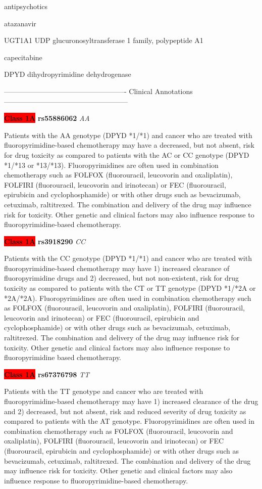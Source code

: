 \documentclass{resume} %
\begin{document}
\begin{rSection}{ antipsychotics }
\begin{rSection}{ atazanavir }
\begin{rSubsection}{ UGT1A1 }{ UDP glucuronosyltransferase 1 family, polypeptide A1 }{}{}
\begin{rSection}{ capecitabine }
\begin{rSubsection}{ DPYD }{ dihydropyrimidine dehydrogenase }{}{}
\item[] ---------------------------------------------------- Clinical Annotations -----------------------------------------------------\newline
\item \textbf{\colorbox{red} {Class 1A}} \textbf{ rs55886062 } \textit{ AA }
\item[] Patients with the AA genotype (DPYD *1/*1) and cancer who are treated with fluoropyrimidine-based chemotherapy may have a decreased, but not absent, risk for drug toxicity as compared to patients with the AC or CC genotype (DPYD *1/*13 or *13/*13). Fluoropyrimidines are often used in combination chemotherapy such as FOLFOX (fluorouracil, leucovorin and oxaliplatin), FOLFIRI (fluorouracil, leucovorin and irinotecan) or FEC (fluorouracil, epirubicin and cyclophosphamide) or with other drugs such as bevacizumab, cetuximab, raltitrexed. The combination and delivery of the drug may influence risk for toxicity. Other genetic and clinical factors may also influence response to fluoropyrimidine-based chemotherapy.\item \textbf{\colorbox{red} {Class 1A}} \textbf{ rs3918290 } \textit{ CC }
\item[] Patients with the CC genotype (DPYD *1/*1) and cancer who are treated with fluoropyrimidine-based chemotherapy may have 1) increased clearance of fluoropyrimidine drugs and 2) decreased, but not non-existent, risk for drug toxicity as compared to patients with the CT or TT genotype (DPYD *1/*2A or *2A/*2A). Fluoropyrimidines are often used in combination chemotherapy such as FOLFOX (fluorouracil, leucovorin and oxaliplatin), FOLFIRI (fluorouracil,  leucovorin and irinotecan) or FEC (fluorouracil, epirubicin and cyclophosphamide) or with other drugs such as bevacizumab, cetuximab, raltitrexed. The combination and delivery of the drug may influence risk for toxicity. Other genetic and clinical factors may also influence response to fluoropyrimidine based chemotherapy.\item \textbf{\colorbox{red} {Class 1A}} \textbf{ rs67376798 } \textit{ TT }
\item[] Patients with the TT genotype and cancer who are treated with fluoropyrimidine-based chemotherapy may have 1) increased clearance of the drug and 2) decreased, but not absent, risk and reduced severity of drug toxicity as compared to patients with the AT genotype. Fluoropyrimidines are often used in combination chemotherapy such as FOLFOX (fluorouracil, leucovorin and oxaliplatin), FOLFIRI (fluorouracil, leucovorin and irinotecan) or FEC (fluorouracil, epirubicin and cyclophosphamide) or with other drugs such as bevacizumab, cetuximab, raltitrexed. The combination and delivery of the drug may influence risk for toxicity. Other genetic and clinical factors may also influence response to fluoropyrimidine-based chemotherapy.
\end{rSubsection}


\end{rSection}
\end{rSubsection}
\end{rSection}
\end{rSection}
\end{document}
